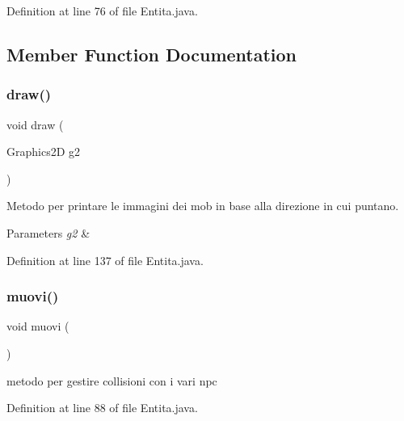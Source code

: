 Definition at line 76 of file Entita.\+java.



\subsection{Member Function Documentation}
\mbox{\label{class_entita_1_1_entita_ae8c972c0fb4fcbc09c2219dd32cbd053}} 
\subsubsection{\texorpdfstring{draw()}{draw()}}
{\footnotesize\ttfamily void draw (\begin{DoxyParamCaption}\item[{Graphics2D}]{g2 }\end{DoxyParamCaption})}



Metodo per printare le immagini dei mob in base alla direzione in cui puntano. 


\begin{DoxyParams}{Parameters}
{\em g2} & \\
\hline
\end{DoxyParams}


Definition at line 137 of file Entita.\+java.

\mbox{\label{class_entita_1_1_entita_a1fe2f184b3cc7345c6a0f08d183a1d0b}} 
\subsubsection{\texorpdfstring{muovi()}{muovi()}}
{\footnotesize\ttfamily void muovi (\begin{DoxyParamCaption}{ }\end{DoxyParamCaption})}



metodo per gestire collisioni con i vari npc 



Definition at line 88 of file Entita.\+java.

